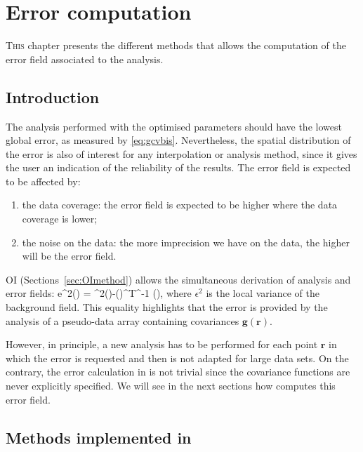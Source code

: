 \chapter{Error computation\label{chap:error}}
\vspace*{-1cm}
\lettrine[lines=2, loversize=-0.1, lraise=0.1]{T}{his} chapter presents the different methods that allows the computation of the error field associated to the analysis.  

\minitoc

\section{Introduction}

The analysis performed with the optimised parameters should have the lowest global error, as measured by \eqref{eq:gcvbis}. Nevertheless, the spatial distribution of the error is also of interest for any interpolation or analysis method, since it gives the user an indication of the reliability of the results. The error field is expected to be affected by:
\begin{enumerate}
\item the data coverage: the error field is expected to be higher where the data coverage is lower;
\item the noise on the data: the more imprecision we have on the data, the higher will be the error field.
\end{enumerate}

OI (Sections~\ref{sec:OImethod}) allows the simultaneous derivation of analysis and error fields:
\be
e^{2}() = \epsilon^{2}()-()^{T}^{-1}  (),
\label{eq:erroroi}
\ee
where $\epsilon^{2}$ is the local variance of the background field. This equality highlights that the error is provided by the analysis of a pseudo-data array containing covariances $\mathbf{g}(\mathbf{r})$. 

However, in principle, a new analysis has to be performed for each point $\mathbf{r}$ in which the error is requested and then is not adapted for large data sets. On the contrary, the error calculation in \diva is not trivial since the covariance functions are never explicitly specified. We will see in the next sections how \diva computes this error field.

\section{Methods implemented in \diva}


